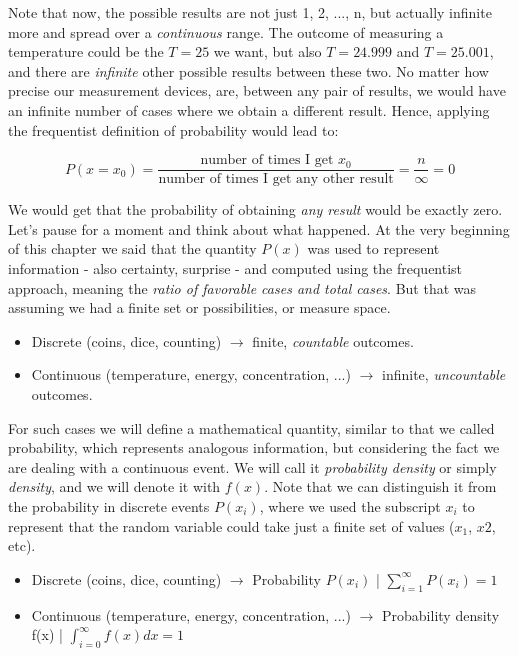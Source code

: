 \documentclass{book}
\begin{document}
Note that now, the possible results are not just 1, 2, ..., n, but actually infinite more and spread over a \textit{continuous} range. The outcome of measuring a temperature could be the $T = 25$ we want, but also $T = 24.999$ and $T = 25.001$, and there are \textit{infinite} other possible results between these two. No matter how precise our measurement devices, are, between any pair of results, we would have an infinite number of cases where we obtain a different result. Hence, applying the frequentist definition of probability would lead to:

\begin{equation}
P(x = x_{0}) = \frac{\text{number of times I get $x_{0}$}}{\text{number of times I get any other result}} = \frac{n}{\infty} = 0
\end{equation}

We would get that the probability of obtaining \textit{any result} would be exactly zero.\\

Let's pause for a moment and think about what happened. At the very beginning of this chapter we said that the quantity $P(x)$ was used to represent information - also certainty, surprise - and computed using the frequentist approach, meaning the \textit{ratio of favorable cases and total cases}. But that was assuming we had a finite set or possibilities, or measure space.

\begin{itemize}
\item Discrete (coins, dice, counting) $\longrightarrow$ finite, \textit{countable} outcomes.
\item Continuous (temperature, energy, concentration, ...) $\longrightarrow$ infinite, \textit{uncountable} outcomes.
\end{itemize}

For such cases we will define a mathematical quantity, similar to that we called probability, which represents analogous information, but considering the fact we are dealing with a continuous event. We will call it \textit{probability density} or simply \textit{density}, and we will denote it with $f(x)$. Note that we can distinguish it from the probability in discrete events $P(x_{i})$, where we used the subscript $x_{i}$ to represent that the random variable could take just a finite set of values ($x_{1}$, $x{2}$, etc).

\begin{itemize}
\item Discrete (coins, dice, counting) $\longrightarrow$ Probability $P(x_{i})$ | $\sum_{i = 1}^{\infty} P(x_{i}) = 1$
\item Continuous (temperature, energy, concentration, ...) $\longrightarrow$ Probability density f(x) | $\int_{i = 0}^{\infty} f(x) dx = 1$
\end{itemize}
\end{document}
